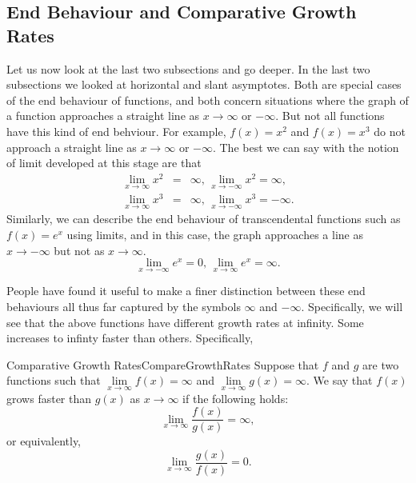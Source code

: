 \subsection{End Behaviour and Comparative Growth Rates}

Let us now look at the last two subsections and go deeper. In the last two
subsections we looked at horizontal and slant asymptotes. Both are special
cases of the end behaviour of functions, and both concern situations where
the graph of a function approaches a straight line as $x\to \infty$
or $-\infty$. But not all functions have this kind of end behviour. For
example, $f(x)=x^2$ and $f(x)=x^3$ do not
approach a straight line as $x\to \infty$ or $-\infty$. The best
we can say with the notion of limit developed at this stage are that%
\begin{eqnarray*}
	\lim_{x\to \infty}x^2 &=&\infty\text{, }\lim_{x\to -\infty}x^2=\infty, \\
	\lim_{x\to \infty}x^3 &=&\infty\text{, }\lim_{x\to -\infty}x^3=-\infty.
\end{eqnarray*}%
Similarly, we can describe the end behaviour of transcendental functions
such as $f(x)=e^x$ using limits, and in this case, the graph
approaches a line as $x\to -\infty$ but not as $x\to \infty$.
\begin{equation*}
\lim_{x\to -\infty}e^x=0\text{, }\lim_{x\to \infty}e^x=\infty.
\end{equation*}

People have found it useful to make a finer distinction between these end
behaviours all thus far captured by the symbols $\infty$ and $-\infty$.
Specifically, we will see that the above functions have different growth
rates at infinity. Some increases to infinty faster than others.
Specifically,

\begin{definition}{Comparative Growth Rates}{CompareGrowthRates}
Suppose that $f$ and $g$ are two functions such that $\lim\limits_{x%
	\to \infty }f\left( x\right) =\infty $ and $\lim\limits_{x%
	\to \infty }g\left( x\right) =\infty .$ We say that $f\left(
x\right) $ grows faster than $g\left( x\right) $ as $x\to \infty $
if the following holds:%
\begin{equation*}
\lim_{x\to \infty }\frac{f\left( x\right) }{g\left( x\right) }%
=\infty ,
\end{equation*}%
or equivalently,%
\begin{equation*}
\lim_{x\to \infty }\frac{g\left( x\right) }{f\left( x\right) }=0.
\end{equation*}
\end{definition}

